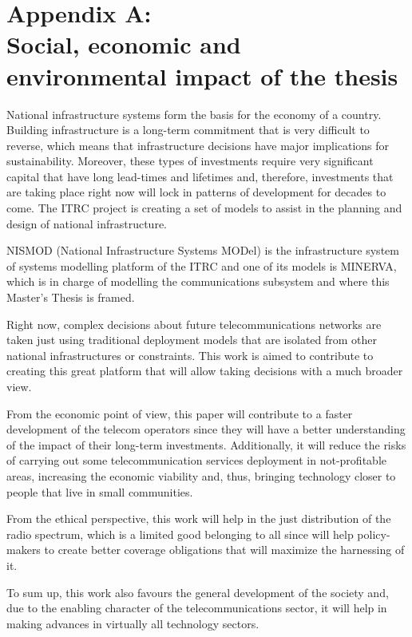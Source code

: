 \vspace{\baselineskip}\chapter*{Appendix A: \\ Social, economic and environmental impact of the thesis}
National infrastructure systems form the basis for the economy of a country. Building infrastructure is a long-term commitment that is very difficult to reverse, which means that infrastructure decisions have major implications for sustainability. Moreover, these types of investments require very significant capital that have long lead-times and lifetimes and, therefore, investments that are taking place right now will lock in patterns of development for decades to come. The ITRC project is creating a set of models to assist in the planning and design of national infrastructure.\par

NISMOD (National Infrastructure Systems MODel) is the infrastructure system of systems modelling platform of the ITRC and one of its models is MINERVA, which is in charge of modelling the communications subsystem and where this Master’s Thesis is framed.\par

Right now, complex decisions about future telecommunications networks are taken just using traditional deployment models that are isolated from other national infrastructures or constraints. This work is aimed to contribute to creating this great platform that will allow taking decisions with a much broader view.\par

From the economic point of view, this paper will contribute to a faster development of the telecom operators since they will have a better understanding of the impact of their long-term investments. Additionally, it will reduce the risks of carrying out some telecommunication services deployment in not-profitable areas, increasing the economic viability and, thus, bringing technology closer to people that live in small communities.\par

From the ethical perspective, this work will help in the just distribution of the radio spectrum, which is a limited good belonging to all since will help policy-makers to create better coverage obligations that will maximize the harnessing of it.\par

To sum up, this work also favours the general development of the society and, due to the enabling character of the telecommunications sector, it will help in making advances in virtually all technology sectors.\par

